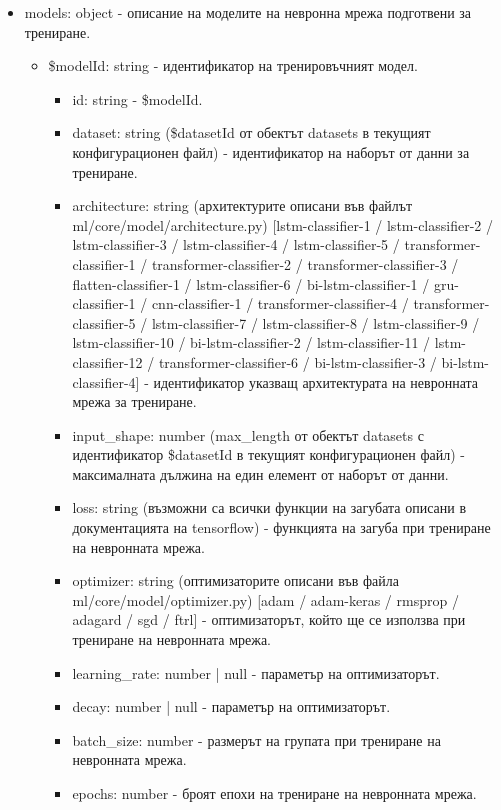 \documentclass{article}
\begin{document}
\begin{itemize}
\begin{itemize}
\begin{itemize}
      \end{itemize}

  \end{itemize}

  \item models: object - описание на моделите на невронна мрежа подготвени за трениране.

  \begin{itemize}

    \item \$modelId: string - идентификатор на тренировъчният модел.

    \begin{itemize}

      \item id: string - \$modelId.
      \item dataset: string (\$datasetId от обектът datasets в текущият конфигурационен файл) - идентификатор на
      наборът от данни за трениране.
      \item architecture: string (архитектурите описани във файлът ml/core/model/architecture.py)
      [lstm-classifier-1 / lstm-classifier-2 / lstm-classifier-3 / lstm-classifier-4 / lstm-classifier-5 /
      transformer-classifier-1 / transformer-classifier-2 / transformer-classifier-3 / flatten-classifier-1 /
      lstm-classifier-6 / bi-lstm-classifier-1 / gru-classifier-1 / cnn-classifier-1 / transformer-classifier-4 /
      transformer-classifier-5 / lstm-classifier-7 / lstm-classifier-8 / lstm-classifier-9 / lstm-classifier-10 /
      bi-lstm-classifier-2 / lstm-classifier-11 / lstm-classifier-12 / transformer-classifier-6 /
      bi-lstm-classifier-3 / bi-lstm-classifier-4] - идентификатор указващ архитектурата на невронната мрежа за
      трениране.
      \item input\_shape: number (max\_length от обектът datasets с идентификатор \$datasetId в текущият
      конфигурационен файл) - максималната дължина на един елемент от наборът от данни.
      \item loss: string (възможни са всички функции на загубата описани в документацията на tensorflow) -
      функцията на загуба при трениране на невронната мрежа.
      \item optimizer: string (оптимизаторите описани във файла ml/core/model/optimizer.py) [adam / adam-keras /
      rmsprop / adagard / sgd / ftrl] - оптимизаторът, който ще се използва при трениране на невронната мрежа.
      \item learning\_rate: number | null - параметър на оптимизаторът.
      \item decay: number | null - параметър на оптимизаторът.
      \item batch\_size: number - размерът на групата при трениране на невронната мрежа.
      \item epochs: number - броят епохи на трениране на невронната мрежа.

    \end{itemize}

  \end{itemize}

\end{itemize}
\end{document}
